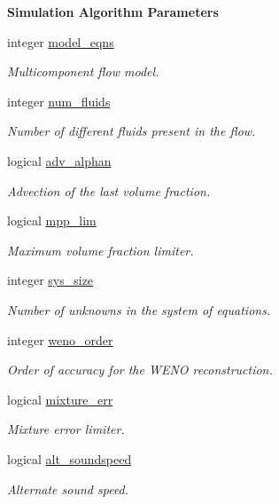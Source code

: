 \begin{Indent}\textbf{ Simulation Algorithm Parameters}\par
\begin{DoxyCompactItemize}
\item 
integer \hyperlink{namespacem__global__parameters_a6cf2e92cfc3b519fb6da6fe9e88fab31}{model\+\_\+eqns}
\begin{DoxyCompactList}\small\item\em Multicomponent flow model. \end{DoxyCompactList}\item 
integer \hyperlink{namespacem__global__parameters_a2f0b96a5aef3925aa7e3cc816754e17e}{num\+\_\+fluids}
\begin{DoxyCompactList}\small\item\em Number of different fluids present in the flow. \end{DoxyCompactList}\item 
logical \hyperlink{namespacem__global__parameters_abebd95d9d0271fbda40f47f75a2d829b}{adv\+\_\+alphan}
\begin{DoxyCompactList}\small\item\em Advection of the last volume fraction. \end{DoxyCompactList}\item 
logical \hyperlink{namespacem__global__parameters_adc35ba450a192812db36f1d6659d64e6}{mpp\+\_\+lim}
\begin{DoxyCompactList}\small\item\em Maximum volume fraction limiter. \end{DoxyCompactList}\item 
integer \hyperlink{namespacem__global__parameters_a4dac2e4ead915635e0c6c33af87be01b}{sys\+\_\+size}
\begin{DoxyCompactList}\small\item\em Number of unknowns in the system of equations. \end{DoxyCompactList}\item 
integer \hyperlink{namespacem__global__parameters_ab8488205257dab4e94258eee55d0d1aa}{weno\+\_\+order}
\begin{DoxyCompactList}\small\item\em Order of accuracy for the W\+E\+NO reconstruction. \end{DoxyCompactList}\item 
logical \hyperlink{namespacem__global__parameters_a3981c7e6886ba3cde245ce4dcc6ca664}{mixture\+\_\+err}
\begin{DoxyCompactList}\small\item\em Mixture error limiter. \end{DoxyCompactList}\item 
logical \hyperlink{namespacem__global__parameters_a5a19b6ba65c32dfc21f4762eceb25f29}{alt\+\_\+soundspeed}
\begin{DoxyCompactList}\small\item\em Alternate sound speed. \end{DoxyCompactList}\end{DoxyCompactItemize}
\end{Indent}
